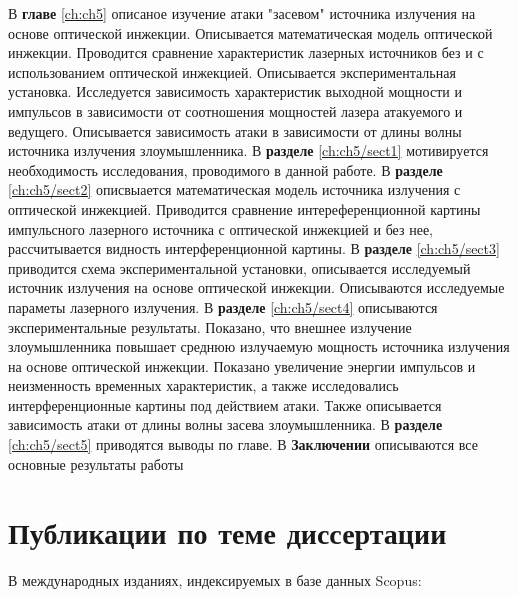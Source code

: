 \newline В \textbf{главе} \ref{ch:ch5} описаное изучение атаки "засевом" источника излучения на основе оптической инжекции. Описывается математическая модель оптической инжекции. Проводится сравнение характеристик лазерных источников без и с использованием оптической инжекцией. Описывается экспериментальная установка. Исследуется зависимость характеристик выходной мощности и импульсов в зависимости от соотношения мощностей лазера атакуемого и ведущего. Описывается зависимость атаки в зависимости от длины волны источника излучения злоумышленника.
\newline В \textbf{разделе} \ref{ch:ch5/sect1} мотивируется необходимость исследования, проводимого в данной работе.
\newline В \textbf{разделе} \ref{ch:ch5/sect2} описвыается математическая модель источника излучения с оптической инжекцией. Приводится сравнение интереференционной картины импульсного лазерного источника с оптической инжекцией и без нее, рассчитывается видность интерференционной картины.
\newline В \textbf{разделе} \ref{ch:ch5/sect3} приводится схема экспериментальной установки, описывается исследуемый источник излучения на основе оптической инжекции. Описываются исследуемые параметы лазерного излучения.
\newline В \textbf{разделе} \ref{ch:ch5/sect4} описываются экспериментальные результаты. Показано, что внешнее излучение злоумышленника повышает среднюю излучаемую мощность источника излучения на основе оптической инжекции. Показано увеличение энергии импульсов и неизменность временных характеристик, а также исследовались интерференционные картины под действием атаки. Также описывается зависимость атаки от длины волны засева злоумышленника.
\newline В \textbf{разделе} \ref{ch:ch5/sect5} приводятся выводы по главе.
\newline В \textbf {Заключении} описываются все основные результаты работы
\newline \section*{Публикации по теме диссертации}
В международных изданиях, индексируемых в базе данных Scopus:\\
